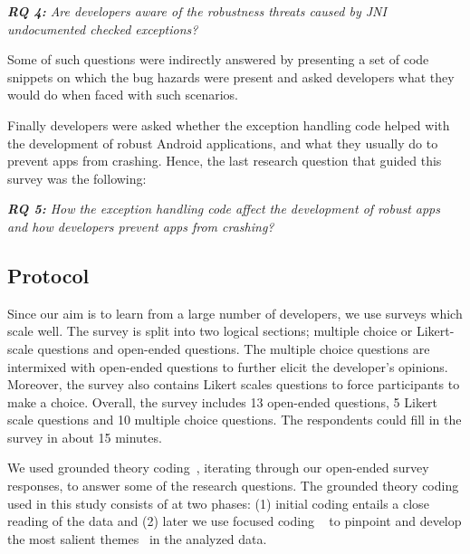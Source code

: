 \emph{\textbf{RQ 4:} Are developers aware of the robustness threats caused by JNI undocumented checked exceptions?}




Some of such questions were indirectly answered by presenting a set of code snippets on which
the bug hazards were present and asked developers what they would do when faced with such scenarios.

Finally developers were asked whether the exception handling code helped with the development of robust Android applications, and what they usually do to prevent apps from crashing. Hence, the last research question that guided this survey was the following:

\emph{\textbf{RQ 5:} How the exception handling code affect the development of robust apps and how developers prevent apps from crashing?}

\subsection{Protocol}

Since our aim is to learn from a large number of developers, we use surveys which scale well.
The survey is split into two logical sections; multiple choice or Likert-scale questions and open-ended questions. The multiple choice questions are intermixed with open-ended questions to further elicit the developer’s opinions. Moreover, the survey also contains Likert scales questions to force participants to make a choice. Overall, the survey includes 13 open-ended questions, 5 Likert scale questions and 10 multiple choice questions. The respondents could fill in the survey in about 15 minutes.

We used grounded theory coding~\cite{charmaz2006}, iterating through our open-ended survey responses, to answer some of the research questions. The grounded theory coding used in this study consists of at two phases: (1) initial coding entails a close reading of the data and (2) later we use focused coding ~\cite{charmaz2006} to pinpoint and develop the most salient themes~\cite{charmaz2006} in the analyzed data.

